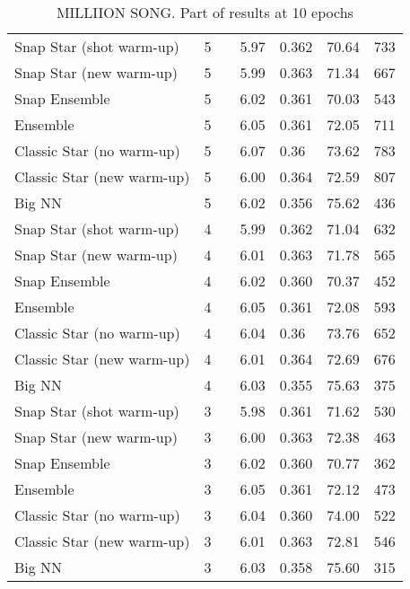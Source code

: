 \begin{table}[ht!]
\begin{center}
\begin{tabular}{ |l|llllll|}
\hline
\hline
Snap Star (shot warm-up) & 5 &  & 5.97 & 0.362 & 70.64 & 733 \\
Snap Star (new warm-up) & 5 &  & 5.99 & 0.363 & 71.34 & 667 \\
Snap Ensemble & 5 &  & 6.02 & 0.361 & 70.03 & 543 \\
Ensemble & 5 &  & 6.05 & 0.361 & 72.05 & 711 \\
Classic Star (no warm-up) & 5 &  & 6.07 & 0.36 & 73.62 & 783 \\
Classic Star (new warm-up) & 5 &  & 6.00 & 0.364 & 72.59 & 807 \\
Big NN & 5 &  & 6.02 & 0.356 & 75.62 & 436 \\
\hline
Snap Star (shot warm-up) & 4 &  & 5.99 & 0.362 & 71.04 & 632 \\
Snap Star (new warm-up) & 4 &  & 6.01 & 0.363 & 71.78 & 565 \\
Snap Ensemble & 4 &  & 6.02 & 0.360 & 70.37 & 452 \\
Ensemble & 4 &  & 6.05 & 0.361 & 72.08 & 593 \\
Classic Star (no warm-up) & 4 &  & 6.04 & 0.36 & 73.76 & 652 \\
Classic Star (new warm-up) & 4 &  & 6.01 & 0.364 & 72.69 & 676 \\
Big NN & 4 &  & 6.03 & 0.355 & 75.63 & 375 \\
\hline
Snap Star (shot warm-up) & 3 &  & 5.98 & 0.361 & 71.62 & 530 \\
Snap Star (new warm-up) & 3 &  & 6.00 & 0.363 & 72.38 & 463 \\
Snap Ensemble & 3 &  & 6.02 & 0.360 & 70.77 & 362 \\
Ensemble & 3 &  & 6.05 & 0.361 & 72.12 & 473 \\
Classic Star (no warm-up) & 3 &  & 6.04 & 0.360 & 74.00 & 522 \\
Classic Star (new warm-up) & 3 &  & 6.01 & 0.363 & 72.81 & 546 \\
Big NN & 3 &  & 6.03 & 0.358 & 75.60 & 315 \\
\hline
\end{tabular}
\end{center}
\caption{MILLIION SONG. Part of results at 10 epochs}
\label{table:MSD10}
\end{table} \begin{table}[ht!]
\centering
{}
\end{table}
